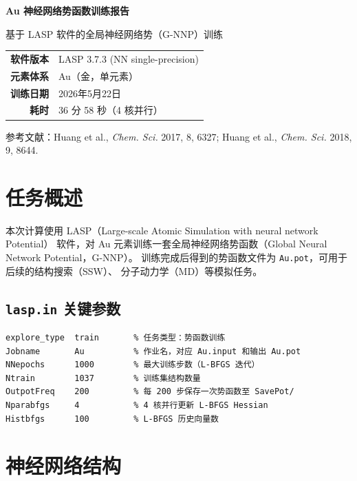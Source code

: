 \documentclass[12pt, a4paper]{article}
\begin{document}
\begin{titlepage}
  \centering
  \vspace*{3cm}
  {\LARGE\bfseries Au 神经网络势函数训练报告\par}
  \vspace{0.5cm}
  {\large 基于 LASP 软件的全局神经网络势（G-NNP）训练\par}
  \vspace{2cm}
  \begin{tabular}{rl}
    \textbf{软件版本} & LASP 3.7.3 (NN single-precision) \\[4pt]
    \textbf{元素体系} & Au（金，单元素） \\[4pt]
    \textbf{训练日期} & 2026年5月22日 \\[4pt]
    \textbf{耗时}     & 36 分 58 秒（4 核并行） \\
  \end{tabular}
  \vfill
  {\small 参考文献：Huang et al., \textit{Chem. Sci.} 2017, 8, 6327;\quad
          Huang et al., \textit{Chem. Sci.} 2018, 9, 8644.}
\end{titlepage}

\section{任务概述}

本次计算使用 LASP（Large-scale Atomic Simulation with neural network Potential）
软件，对 Au 元素训练一套全局神经网络势函数（Global Neural Network Potential，G-NNP）。
训练完成后得到的势函数文件为 \texttt{Au.pot}，可用于后续的结构搜索（SSW）、
分子动力学（MD）等模拟任务。

\subsection{\texttt{lasp.in} 关键参数}

\begin{lstlisting}
explore_type  train       % 任务类型：势函数训练
Jobname       Au          % 作业名，对应 Au.input 和输出 Au.pot
NNepochs      1000        % 最大训练步数（L-BFGS 迭代）
Ntrain        1037        % 训练集结构数量
OutpotFreq    200         % 每 200 步保存一次势函数至 SavePot/
Nparabfgs     4           % 4 核并行更新 L-BFGS Hessian
Histbfgs      100         % L-BFGS 历史向量数
\end{lstlisting}

\section{神经网络结构}
\end{document}
